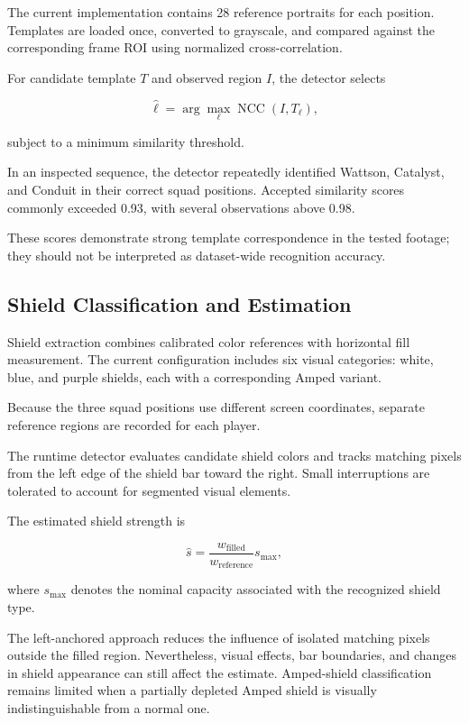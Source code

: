 \documentclass[10pt,letterpaper]{article}
\begin{document}
The current implementation contains 28 reference portraits
for each position. Templates are loaded once, converted to
grayscale, and compared against the corresponding frame ROI
using normalized cross-correlation.

For candidate template $T$ and observed region $I$, the
detector selects

\[
    \hat{\ell} =
    \arg\max_{\ell}
    \operatorname{NCC}(I,T_{\ell}),
\]

subject to a minimum similarity threshold.

In an inspected sequence, the detector repeatedly identified
Wattson, Catalyst, and Conduit in their correct squad positions.
Accepted similarity scores commonly exceeded 0.93, with
several observations above 0.98.

These scores demonstrate strong template correspondence in
the tested footage; they should not be interpreted as
dataset-wide recognition accuracy.

\subsection{Shield Classification and Estimation}

Shield extraction combines calibrated color references with
horizontal fill measurement. The current configuration includes
six visual categories: white, blue, and purple shields, each
with a corresponding Amped variant.

Because the three squad positions use different screen
coordinates, separate reference regions are recorded for
each player.

The runtime detector evaluates candidate shield colors and
tracks matching pixels from the left edge of the shield bar
toward the right. Small interruptions are tolerated to
account for segmented visual elements.

The estimated shield strength is

\[
    \hat{s} =
    \frac{w_{\mathrm{filled}}}{w_{\mathrm{reference}}}
    s_{\max},
\]

where $s_{\max}$ denotes the nominal capacity associated
with the recognized shield type.

The left-anchored approach reduces the influence of isolated
matching pixels outside the filled region. Nevertheless,
visual effects, bar boundaries, and changes in shield
appearance can still affect the estimate. Amped-shield
classification remains limited when a partially depleted
Amped shield is visually indistinguishable from a normal one.
\end{document}
